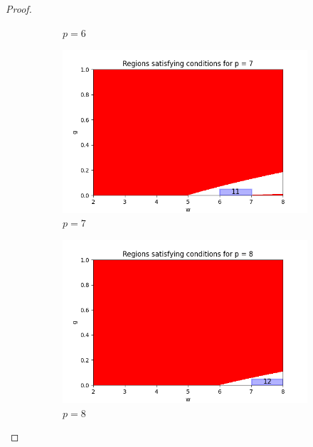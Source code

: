 \documentclass{article}
\begin{document}
\begin{proof}
\begin{figure}[ht]
\begin{subfigure}{0.32\textwidth}
        \caption{$p = 6$}
    \end{subfigure}
    \hfill
    \begin{subfigure}{0.32\textwidth}
        \includegraphics[width=\linewidth]{plotsexcom/plot_p_7.png}
        \caption{$p = 7$}
    \end{subfigure}
    \hfill
    \begin{subfigure}{0.32\textwidth}
        \includegraphics[width=\linewidth]{plotsexcom/plot_p_8.png}
        \caption{$p = 8$}
    \end{subfigure}
    \begin{subfigure}{0.32\textwidth}

\end{subfigure}
\end{figure}
\end{proof}
\end{document}
